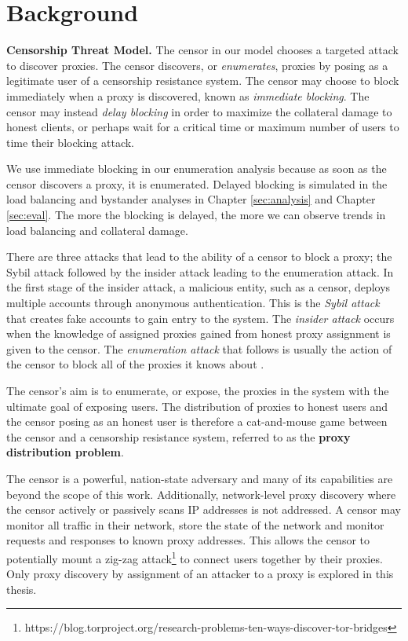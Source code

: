 \chapter{Background}
\label{sec:background}
\newtheorem{theorem}{Theorem}

\textbf{Censorship Threat Model.} The censor in our model chooses a targeted attack to discover proxies. The censor discovers, or \textit{enumerates}, proxies by posing as a legitimate user of a censorship resistance system. The censor may choose to block immediately when a proxy is discovered, known as \textit{immediate blocking}. The censor may instead \textit{delay blocking} in order to maximize the collateral damage to honest clients, or perhaps wait for  a critical time or maximum number of users to time their blocking attack.

We use immediate blocking in our enumeration analysis because as soon as the censor discovers a proxy, it is enumerated. Delayed blocking is simulated in the load balancing and bystander analyses in Chapter \ref{sec:analysis} and Chapter \ref{sec:eval}. The more the blocking is delayed, the more we can observe trends in load balancing and collateral damage.

There are three attacks that lead to the ability of a censor to block a proxy; the Sybil attack followed by the insider attack leading to the enumeration attack. In the first stage of the insider attack, a malicious entity, such as a censor, deploys multiple accounts through anonymous authentication. This is the \textit{Sybil attack} that creates fake accounts to gain entry to the system. The \textit{insider attack} occurs when the knowledge of assigned proxies gained from honest proxy assignment is given to the censor. The \textit{enumeration attack} that follows is usually the action of the censor to block all of the proxies it knows about \cite{wang2013rbridge}.

The censor's aim is to enumerate, or expose, the proxies in the system with the ultimate goal of exposing users. The distribution of proxies to honest users and the censor posing as an honest user is therefore a cat-and-mouse game between the censor and a censorship resistance system, referred to as the \textbf{proxy distribution problem}. 

The censor is a powerful, nation-state adversary and many of its capabilities are beyond the scope of this work. Additionally, network-level proxy discovery where the censor actively or passively scans IP addresses is not addressed. A censor may monitor all traffic in their network, store the state of the network and monitor requests and responses to known proxy addresses. This allows the censor to potentially mount a zig-zag attack\footnote{https://blog.torproject.org/research-problems-ten-ways-discover-tor-bridges} to connect users together by their proxies. Only proxy discovery by assignment of an attacker to a proxy is explored in this thesis.

